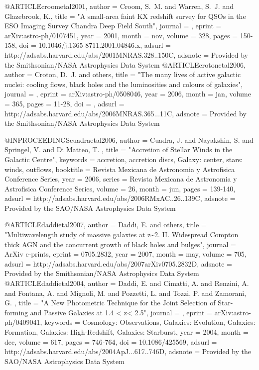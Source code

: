 {{{{{{{{{{{{{{{@ARTICLE{croometal2001,
   author = {{Croom}, S.~M. and {Warren}, S.~J. and {Glazebrook}, K.},
    title = "{A small-area faint KX redshift survey for QSOs in the ESO Imaging Survey Chandra Deep Field South}",
  journal = {\mnras},
   eprint = {arXiv:astro-ph/0107451},
     year = 2001,
    month = nov,
   volume = 328,
    pages = {150-158},
      doi = {10.1046/j.1365-8711.2001.04846.x},
   adsurl = {http://adsabs.harvard.edu/abs/2001MNRAS.328..150C},
  adsnote = {Provided by the Smithsonian/NASA Astrophysics Data System}
}
@ARTICLE{crotonetal2006,
   author = {{Croton}, D.~J. and others},
    title = "{The many lives of active galactic nuclei: cooling flows, black holes and the luminosities and colours of galaxies}",
  journal = {\mnras},
   eprint = {arXiv:astro-ph/0508046},
     year = 2006,
    month = jan,
   volume = 365,
    pages = {11-28},
      doi = { },
   adsurl = {http://adsabs.harvard.edu/abs/2006MNRAS.365...11C},
  adsnote = {Provided by the Smithsonian/NASA Astrophysics Data System}
}

@INPROCEEDINGS{cuadraetal2006,
   author = {{Cuadra}, J. and {Nayakshin}, S. and {Springel}, V. and {Di Matteo}, T.
	},
    title = "{Accretion of Stellar Winds in the Galactic Centre}",
 keywords = {accretion, accretion discs, Galaxy: center, stars: winds, outflows},
booktitle = {Revista Mexicana de Astronomia y Astrofisica Conference Series},
     year = 2006,
   series = {Revista Mexicana de Astronomia y Astrofisica Conference Series},
   volume = 26,
    month = jun,
    pages = {139-140},
   adsurl = {http://adsabs.harvard.edu/abs/2006RMxAC..26..139C},
  adsnote = {Provided by the SAO/NASA Astrophysics Data System}
}




@ARTICLE{daddietal2007,
   author = {{Daddi}, E. and others}, 
    title = "{Multiwavelength study of massive galaxies at z\~{}2. II. Widespread Compton thick AGN and the concurrent growth of black holes and bulges}",
  journal = {ArXiv e-prints},
   eprint = {0705.2832},
     year = 2007,
    month = may,
   volume = 705,
   adsurl = {http://adsabs.harvard.edu/abs/2007arXiv0705.2832D},
  adsnote = {Provided by the Smithsonian/NASA Astrophysics Data System}
}
@ARTICLE{daddietal2004,
   author = {{Daddi}, E. and {Cimatti}, A. and {Renzini}, A. and {Fontana}, A. and 
	{Mignoli}, M. and {Pozzetti}, L. and {Tozzi}, P. and {Zamorani}, G.
	},
    title = "{A New Photometric Technique for the Joint Selection of Star-forming and Passive Galaxies at 1.4 < z< 2.5}",
  journal = {\apj},
   eprint = {arXiv:astro-ph/0409041},
 keywords = {Cosmology: Observations, Galaxies: Evolution, Galaxies: Formation, Galaxies: High-Redshift, Galaxies: Starburst},
     year = 2004,
    month = dec,
   volume = 617,
    pages = {746-764},
      doi = {10.1086/425569},
   adsurl = {http://adsabs.harvard.edu/abs/2004ApJ...617..746D},
  adsnote = {Provided by the SAO/NASA Astrophysics Data System}
}


}}}}}}}}}}}}}}}
